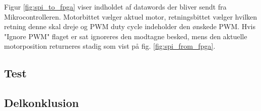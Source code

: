 

Figur \ref{fig:spi_to_fpga} viser indholdet af datawords der bliver sendt fra Mikrocontrolleren. 
Motorbittet vælger aktuel motor, retningsbittet vælger hvilken retning denne skal dreje og PWM duty cycle indeholder den ønskede PWM. 
Hvis "Ignore PWM" flaget er sat ignoreres den modtagne besked, mens den aktuelle motorposition returneres stadig som vist på fig.  \ref{fig:spi_from_fpga}. 






\subsection{Test} 





\subsection{Delkonklusion}
